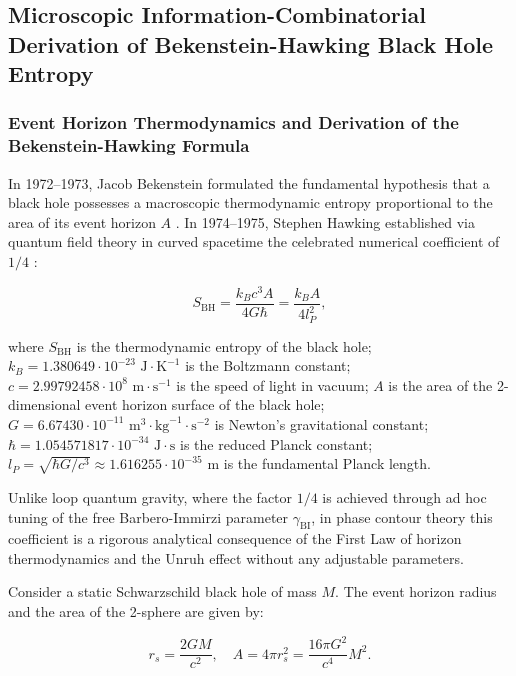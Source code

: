 \subsection{Microscopic Information-Combinatorial Derivation of Bekenstein-Hawking Black Hole Entropy}\label{sec:2.6}

\subsubsection{Event Horizon Thermodynamics and Derivation of the Bekenstein-Hawking Formula}\label{sec:2.6.1}

In 1972--1973, Jacob Bekenstein formulated the fundamental hypothesis that a black hole possesses a macroscopic thermodynamic entropy proportional to the area of its event horizon $A$ \cite{ref19}. In 1974--1975, Stephen Hawking established via quantum field theory in curved spacetime the celebrated numerical coefficient of $1/4$ \cite{ref18}:

\begin{equation}\label{eq:2.56}\label{eq:2.107}\tag{2.56}
S_{\text{BH}} = \frac{k_B c^3 A}{4 G \hbar} = \frac{k_B A}{4 l_P^2},
\end{equation}

where $S_{\text{BH}}$ is the thermodynamic entropy of the black hole;  
$k_B = 1.380649 \cdot 10^{-23}\text{ J}\cdot\text{K}^{-1}$ is the Boltzmann constant;  
$c = 2.99792458 \cdot 10^8\text{ m}\cdot\text{s}^{-1}$ is the speed of light in vacuum;  
$A$ is the area of the 2-dimensional event horizon surface of the black hole;  
$G = 6.67430 \cdot 10^{-11}\text{ m}^3\cdot\text{kg}^{-1}\cdot\text{s}^{-2}$ is Newton's gravitational constant;  
$\hbar = 1.054571817 \cdot 10^{-34}\text{ J}\cdot\text{s}$ is the reduced Planck constant;  
$l_P = \sqrt{\hbar G / c^3} \approx 1.616255 \cdot 10^{-35}\text{ m}$ is the fundamental Planck length.

Unlike loop quantum gravity, where the factor $1/4$ is achieved through ad hoc tuning of the free Barbero-Immirzi parameter $\gamma_{\text{BI}}$, in phase contour theory this coefficient is a rigorous analytical consequence of the First Law of horizon thermodynamics and the Unruh effect without any adjustable parameters.

Consider a static Schwarzschild black hole of mass $M$. The event horizon radius and the area of the 2-sphere are given by:

\begin{equation}\label{eq:2.57}\label{eq:2.108}\tag{2.57}
r_s = \frac{2GM}{c^2}, \quad A = 4\pi r_s^2 = \frac{16\pi G^2}{c^4} M^2.
\end{equation}

